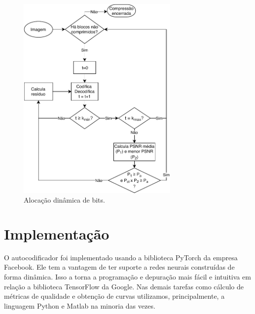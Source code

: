 \begin{figure}
\centering
\includegraphics[width=0.7\textwidth]{figuras/fluxograma.pdf}
\caption{Alocação dinâmica de bits.}
\label{fig:flux_vr}
\end{figure}		


\section{Implementação}
O autocodificador foi implementado usando a biblioteca PyTorch da empresa Facebook.  Ele tem a vantagem de ter suporte a redes neurais construídas de forma dinâmica. Isso a torna a programação e depuração mais fácil e intuitiva em relação a biblioteca TensorFlow da Google. 
Nas demais tarefas como cálculo de métricas de qualidade e obtenção de curvas utilizamos, principalmente, a linguagem Python e Matlab na minoria das vezes.  
